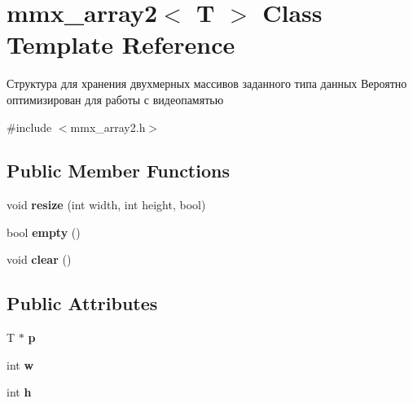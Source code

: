 \hypertarget{classmmx__array2}{\section{mmx\+\_\+array2$<$ T $>$ Class Template Reference}
\label{classmmx__array2}
}


Структура для хранения двухмерных массивов заданного типа данных Вероятно оптимизирован для работы с видеопамятью  




{\ttfamily \#include $<$mmx\+\_\+array2.\+h$>$}

\subsection*{Public Member Functions}
\begin{DoxyCompactItemize}
\item 
\hypertarget{classmmx__array2_ab91171378bb852edb5c539ff9f1b1ba0}{void {\bfseries resize} (int width, int height, bool)}\label{classmmx__array2_ab91171378bb852edb5c539ff9f1b1ba0}

\item 
\hypertarget{classmmx__array2_a5fa7fe8a409091b6d1ae664a80552307}{bool {\bfseries empty} ()}\label{classmmx__array2_a5fa7fe8a409091b6d1ae664a80552307}

\item 
\hypertarget{classmmx__array2_a67c8a4790849f483deb9a7113f78a178}{void {\bfseries clear} ()}\label{classmmx__array2_a67c8a4790849f483deb9a7113f78a178}

\end{DoxyCompactItemize}
\subsection*{Public Attributes}
\begin{DoxyCompactItemize}
\item 
\hypertarget{classmmx__array2_af58c57c4dbbe49a06d90d077498f9a3c}{T $\ast$ {\bfseries p}}\label{classmmx__array2_af58c57c4dbbe49a06d90d077498f9a3c}

\item 
\hypertarget{classmmx__array2_aaa57fdc3151aefd7e9019db52310e222}{int {\bfseries w}}\label{classmmx__array2_aaa57fdc3151aefd7e9019db52310e222}

\item 
\hypertarget{classmmx__array2_a5466374e097f5bb0b5999cf25a813155}{int {\bfseries h}}\label{classmmx__array2_a5466374e097f5bb0b5999cf25a813155}

\end{DoxyCompactItemize}


